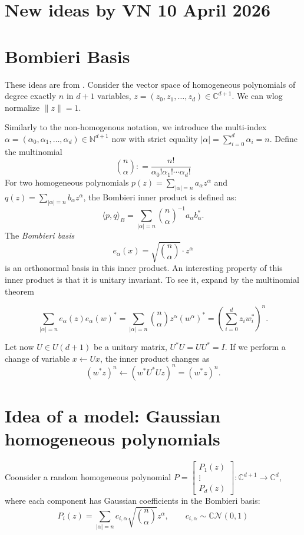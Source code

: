 \documentclass[12pt]{article}
\begin{document}
\section{New ideas by VN 10 April 2026}

\section*{Bombieri Basis}
These ideas are from \cite[Chapters 16-17-18]{BC}.
Consider the vector space of homogeneous polynomials of degree exactly $n$ in $d+1$ variables, $z = (z_0, z_1, \dots, z_d) \in \mathbb{C}^{d+1}$. We can wlog normalize $\| z \|=1$.

Similarly to the non-homogenous notation, we introduce the multi-index $\alpha = (\alpha_0, \alpha_1, \dots, \alpha_d) \in \mathbb{N}^{d+1}$ now with strict equality $|\alpha| = \sum_{i=0}^d \alpha_i = n$.
Define the multinomial 
\[
    \binom{n}{\alpha}: = \frac{n!}{\alpha_0! \alpha_1! \cdots \alpha_d!}
\]
For two homogeneous polynomials $p(z) = \sum_{|\alpha|=n} a_\alpha z^\alpha$ and $q(z) = \sum_{|\alpha|=n} b_\alpha z^\alpha$, the Bombieri inner product is defined as:
\[
    \langle p,q \rangle_{B} = \sum_{|\alpha|=n} \binom{n}{\alpha}^{-1} a_\alpha b_\alpha^*.\]
The \emph{Bombieri basis}
\[
    e_\alpha(x) = \sqrt{\binom{n}{\alpha}} \cdot z^\alpha
\]
is an orthonormal basis in this inner product. An interesting property of this inner product is that it is unitary invariant. To see it, expand by the multinomial theorem

\[ \sum_{|\alpha|=n} e_\alpha(z) e_\alpha(w)^* = \sum_{|\alpha|=n} \binom{n}{\alpha} z^\alpha (w^\alpha)^* = \left(\sum_{i=0}^d z_i w_i^*\right)^n.  \] 


Let now $U \in U(d+1)$ be a unitary matrix, $U^*U=UU^*=I$. If we perform a change of variable $x \leftarrow Ux$, the inner product changes as
\[ (w^*z)^n \leftarrow (w^*U^*Uz)^n = (w^*z)^n.  \]




\section*{Idea of a model: Gaussian homogeneous polynomials}
Coonsider a random homogeneous polynomial $P = \begin{bmatrix}
P_1(z)\\
\vdots\\
P_d(z)
\end{bmatrix} : \mathbb{C}^{d+1} \to \mathbb{C}^d$, where each component has Gaussian coefficients in the Bombieri basis:
\begin{equation}
    P_i(z) = \sum_{|\alpha|=n} c_{i, \alpha} \sqrt{\binom{n}{\alpha}} z^\alpha, \qquad c_{i, \alpha} \sim \mathbb{C}\mathcal{N}(0,1)
\end{equation}
\end{document}
